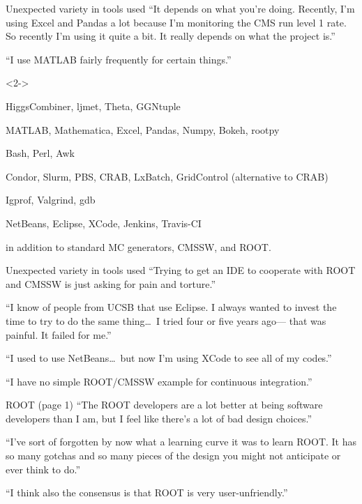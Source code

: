 \documentclass{beamer}
\begin{document}
\begin{frame}{Unexpected variety in tools used}
\vspace{0.5 cm}
\textcolor{aug29}{``It depends on what you're doing. Recently, I'm using Excel and Pandas a lot because I'm monitoring the CMS run level 1 rate. So recently I'm using it quite a bit. It really depends on what the project is.''}

\vfill
\vfill
\textcolor{aug31}{``I use MATLAB fairly frequently for certain things.''}

\vfill
\begin{uncoverenv}<2->
\begin{block}{}
\small
HiggsCombiner, ljmet, Theta, GGNtuple

MATLAB, Mathematica, Excel, Pandas, Numpy, Bokeh, rootpy

Bash, Perl, Awk

Condor, Slurm, PBS, CRAB, LxBatch, GridControl (alternative to CRAB)

Igprof, Valgrind, gdb

NetBeans, Eclipse, XCode, Jenkins, Travis-CI

in addition to standard MC generators, CMSSW, and ROOT.
\end{block}
\end{uncoverenv}
\end{frame}

\begin{frame}{Unexpected variety in tools used}
\vspace{0.5 cm}
\textcolor{aug29}{``Trying to get an IDE to cooperate with ROOT and CMSSW is just asking for pain and torture.''}

\vfill
\textcolor{aug31}{``I know of people from UCSB that use Eclipse. I always wanted to invest the time to try to do the same thing\ldots\ I tried four or five years ago--- that was painful. It failed for me.''}

\vfill
\textcolor{aug31}{``I used to use NetBeans\ldots\ but now I'm using XCode to see all of my codes.''}

\vfill
\textcolor{aug29}{``I have no simple ROOT/CMSSW example for continuous integration.''}
\end{frame}

\begin{frame}{ROOT (page 1)}
\vspace{0.5 cm}
\textcolor{aug31}{``The ROOT developers are a lot better at being software developers than I am, but I feel like there's a lot of bad design choices.''}

\vfill
\textcolor{aug31}{``I've sort of forgotten by now what a learning curve it was to learn ROOT. It has so many gotchas and so many pieces of the design you might not anticipate or ever think to do.''}

\vfill
\textcolor{aug31}{``I think also the consensus is that ROOT is very user-unfriendly.''}
\end{frame}
\end{document}
